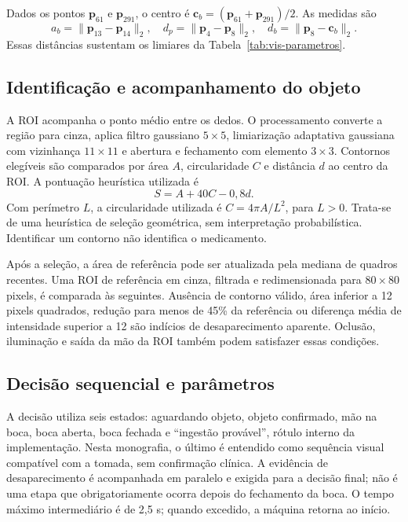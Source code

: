 Dados os pontos $\mathbf{p}_{61}$ e $\mathbf{p}_{291}$, o centro é $\mathbf{c}_b=(\mathbf{p}_{61}+\mathbf{p}_{291})/2$. As medidas são
\begin{equation}\label{eq:vis-distancias}
a_b=\|\mathbf{p}_{13}-\mathbf{p}_{14}\|_2,\quad
d_p=\|\mathbf{p}_{4}-\mathbf{p}_{8}\|_2,\quad
d_b=\|\mathbf{p}_{8}-\mathbf{c}_b\|_2.
\end{equation}
Essas distâncias sustentam os limiares da Tabela~\ref{tab:vis-parametros}. 

\subsection{Identificação e acompanhamento do objeto}
A ROI acompanha o ponto médio entre os dedos. O processamento converte a região para cinza, aplica filtro gaussiano $5\times5$, limiarização adaptativa gaussiana com vizinhança $11\times11$ e abertura e fechamento com elemento $3\times3$. Contornos elegíveis são comparados por área $A$, circularidade $C$ e distância $d$ ao centro da ROI. A pontuação heurística utilizada é
\begin{equation}\label{eq:vis-score}
S=A+40C-0{,}8d.
\end{equation}
Com perímetro $L$, a circularidade utilizada é $C=4\pi A/L^2$, para $L>0$. Trata-se de uma heurística de seleção geométrica, sem interpretação probabilística. Identificar um contorno não identifica o medicamento. 

Após a seleção, a área de referência pode ser atualizada pela mediana de quadros recentes. Uma ROI de referência em cinza, filtrada e redimensionada para $80\times80$ pixels, é comparada às seguintes. Ausência de contorno válido, área inferior a 12 pixels quadrados, redução para menos de 45\% da referência ou diferença média de intensidade superior a 12 são indícios de desaparecimento aparente. Oclusão, iluminação e saída da mão da ROI também podem satisfazer essas condições. 

\subsection{Decisão sequencial e parâmetros}
A decisão utiliza seis estados: aguardando objeto, objeto confirmado, mão na boca, boca aberta, boca fechada e ``ingestão provável'', rótulo interno da implementação. Nesta monografia, o último é entendido como sequência visual compatível com a tomada, sem confirmação clínica. A evidência de desaparecimento é acompanhada em paralelo e exigida para a decisão final; não é uma etapa que obrigatoriamente ocorra depois do fechamento da boca. O tempo máximo intermediário é de 2,5 s; quando excedido, a máquina retorna ao início. 

